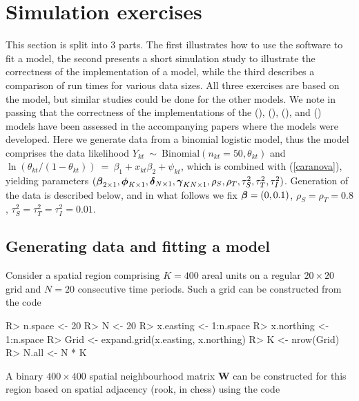 \documentclass[article, nojss]{jss}
\newcommand{\bd}[1]{\ensuremath{\mbox{\boldmath $#1$}}}
\begin{document}
\section{Simulation exercises}\label{section4}
This section is split into 3 parts. The first illustrates how to use the software to fit a model, the second presents a short simulation study to illustrate the correctness of the  implementation of a model, while the third describes a comparison of run times for various data sizes. All three exercises are based on the  model, but similar studies could be done for the other models. We note in passing that the correctness of the   implementations of  the  (\citealp{napier2016}),  (\citealp{rushworth2014}),  (\citealp{rushworth2016}), and  (\citealp{lee2016}) models have been assessed in the accompanying papers where the models were developed. Here we generate data from a binomial logistic model, thus the model comprises the data likelihood $Y_{kt}~\sim~\mbox{Binomial}(n_{kt}=50, \theta_{kt})$ and $\ln(\theta_{kt}/(1-\theta_{kt}))~=~\beta_1 + x_{kt}\beta_2 + \psi_{kt}$, which is combined with  (\ref{caranova}), yielding parameters $(\bd{\beta}_{2\times 1}, \bd{\phi}_{K\times 1}, \bd{\delta}_{N\times 1}, \bd{\gamma}_{KN\times 1}, \rho_S, \rho_T, \tau^2_S, \tau^2_T, \tau^2_I)$. Generation of the  data is described below, and in what follows we fix $\bd{\beta}=(0, 0.1)$, $\rho_S=\rho_T=0.8$, $\tau^2_S=\tau^2_T=\tau^2_I=0.01$.

\subsection{Generating data and fitting a model}\label{section4.1}
Consider a spatial region comprising $K=400$ areal units on a regular $20\times 20$ grid and $N=20$ consecutive time periods. Such a grid can be constructed from the code

\begin{Schunk}
\begin{Sinput}
R>  n.space <- 20
R>  N <- 20
R>  x.easting <- 1:n.space
R>  x.northing <- 1:n.space
R>  Grid <- expand.grid(x.easting, x.northing)
R>  K <- nrow(Grid)
R>  N.all <- N * K
\end{Sinput}
\end{Schunk}

A binary $400\times 400$ spatial neighbourhood matrix $\mathbf{W}$ can be constructed for this region based on spatial adjacency (rook, in chess) using the code
\end{document}
